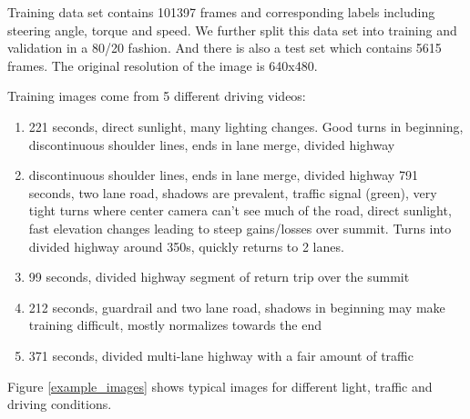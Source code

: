 \documentclass[10pt,twocolumn,letterpaper]{article}
\begin{document}
Training data set contains 101397 frames and corresponding labels including steering angle, torque and speed. We further split this data set into training and validation in a 80/20 fashion. And there is also a test set which contains 5615 frames. The original resolution of the image is 640x480.

Training images come from 5 different driving videos:\\


\begin{enumerate}
	\item 221 seconds, direct sunlight, many lighting changes. Good turns in beginning, discontinuous shoulder lines, ends in lane merge, divided highway
	\item discontinuous shoulder lines, ends in lane merge, divided highway
	791 seconds, two lane road, shadows are prevalent, traffic signal (green), very tight turns where center camera can't see much of the road, direct sunlight, fast elevation changes leading to steep gains/losses over summit. Turns into divided highway around 350s, quickly returns to 2 lanes.
	\item 99 seconds, divided highway segment of return trip over the summit
	\item 212 seconds, guardrail and two lane road, shadows in beginning may make training difficult, mostly normalizes towards the end
	\item 371 seconds, divided multi-lane highway with a fair amount of traffic
	
\end{enumerate}


Figure \ref{example_images} shows typical images for different light, traffic and driving conditions.
\end{document}
